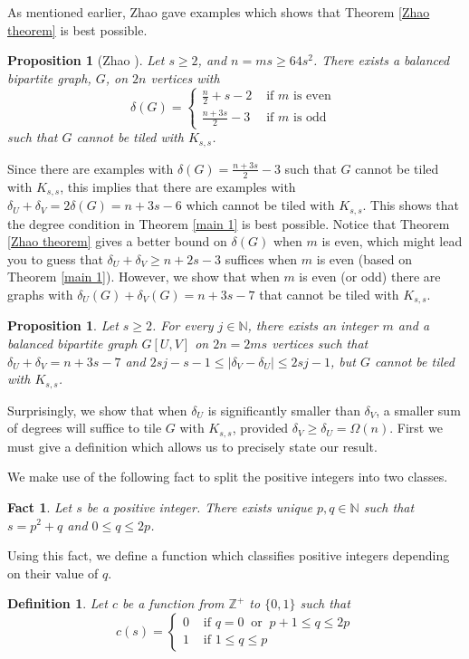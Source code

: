 \documentclass[oneside,12pt]{memoir}
\newtheorem{proposition}[theorem]{Proposition}
\newtheorem{fact}[theorem]{Fact}
\newtheorem{definition}[theorem]{Definition}
\begin{document}
As mentioned earlier, Zhao gave examples which shows that Theorem \ref{Zhao theorem} is best possible.

\begin{proposition}[Zhao \cite{Z}]\label{Zhao prop}
Let $s\geq 2$, and $n=ms\geq 64s^2$.  There exists a balanced bipartite graph, $G$, on $2n$ vertices with
$$\delta(G)= \left\lbrace \begin{array}{ll} \frac{n}{2}+s-2   & \text{ if } m \text{ is even } \\
             \frac {n+3s}{2}-3 & \text{ if } m \text{ is odd } \end{array} \right. $$
such that $G$ cannot be tiled with $K_{s,s}$.
\end{proposition}

Since there are examples with $\delta(G)=\frac {n+3s}{2}-3$ such that $G$ cannot be tiled with $K_{s,s}$, this implies that there are examples with $\delta_U+\delta_V=2\delta(G)=n+3s-6$ which cannot be tiled with $K_{s,s}$.  This shows that the degree condition in Theorem \ref{main 1} is best possible.  Notice that Theorem \ref{Zhao theorem} gives a better bound on $\delta(G)$ when $m$ is even, which might lead you to guess that $\delta_U+\delta_V\geq n+2s-3$ suffices when $m$ is even (based on Theorem \ref{main 1}).  However, we show that when $m$ is even (or odd) there are graphs with $\delta_U(G)+\delta_V(G)=n+3s-7$ that cannot be tiled with $K_{s,s}$.

\begin{proposition}\label{meven}
Let $s\geq 2$.  For every $j\in \mathbb{N}$, there exists an integer $m$ and a balanced bipartite graph $G[U,V]$ on $2n=2ms$ vertices such that $\delta_U+\delta_V=n+3s-7$ and $2sj-s-1\leq |\delta_V-\delta_U|\leq 2sj-1$, but $G$ cannot be tiled with $K_{s,s}$.
\end{proposition}

Surprisingly, we show that when $\delta_U$ is significantly smaller than $\delta_V$, a smaller sum of degrees will suffice to tile $G$ with $K_{s,s}$, provided $\delta_V\geq \delta_U =\Omega(n)$.  First we must give a definition which allows us to precisely state our result.

We make use of the following fact to split the positive integers into two classes.
\begin{fact}
Let $s$ be a positive integer.  There exists unique $p,q\in \mathbb{N}$ such that $s=p^2+q$ and $0\leq q\leq 2p$.
\end{fact}
Using this fact, we define a function which classifies positive integers depending on their value of $q$.
\begin{definition}
Let $c$ be a function from $\mathbb{Z}^+$ to $\{0,1\}$ such that 
$$c(s) = \left\lbrace \begin{array}{ll} 0   & \text{ if } q=0 ~\text{ or }~ p+1\leq q\leq 2p\\
               1 & \text{ if } 1\leq q\leq p  \end{array} \right. $$
\end{definition} 
\end{document}
